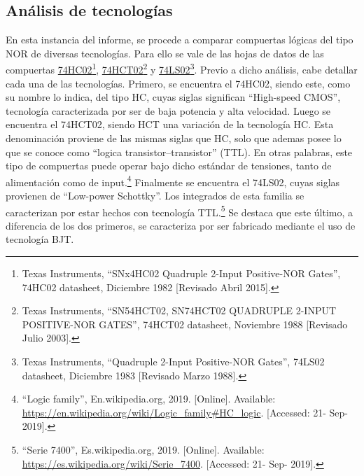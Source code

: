 


\subsection{Análisis de tecnologías}

En esta instancia del informe, se procede a comparar compuertas lógicas del tipo NOR de diversas tecnologías. Para ello se vale de las hojas de datos de las compuertas \href{http://www.ti.com/product/SN74HC02}{74HC02}\footnote{Texas Instruments, ``SNx4HC02 Quadruple 2-Input Positive-NOR Gates'', 74HC02 datasheet, Diciembre 1982 [Revisado Abril 2015].}, \href{http://www.ti.com/product/SN74HCT02}{74HCT02}\footnote{Texas Instruments, ``SN54HCT02, SN74HCT02 QUADRUPLE 2-INPUT POSITIVE-NOR GATES'', 74HCT02 datasheet, Noviembre 1988 [Revisado Julio 2003].} y \href{http://www.ti.com/product/SN74LS02}{74LS02}\footnote{Texas Instruments, ``Quadruple 2-Input Positive-NOR Gates'', 74LS02 datasheet, Diciembre 1983 [Revisado Marzo 1988].}. Previo a dicho análisis, cabe detallar cada una de las tecnologías. Primero, se encuentra el 74HC02, siendo este, como su nombre lo indica, del tipo HC, cuyas siglas significan ``High-speed CMOS'', tecnología caracterizada por ser de baja potencia y alta velocidad. Luego se encuentra el 74HCT02, siendo HCT una variación de la tecnología HC. Esta denominación proviene de las mismas siglas que HC, solo que ademas posee lo que se conoce como ``logica transistor–transistor'' (TTL). En otras palabras, este tipo de compuertas puede operar bajo dicho estándar de tensiones, tanto de alimentación como de input.\footnote{``Logic family'', En.wikipedia.org, 2019. [Online]. Available: \url{https://en.wikipedia.org/wiki/Logic\_family\#HC\_logic}. [Accessed: 21- Sep- 2019].} Finalmente se encuentra el 74LS02, cuyas siglas provienen de ``Low-power Schottky''. Los integrados de esta familia se caracterizan por estar hechos con tecnología TTL.\footnote{``Serie 7400'', Es.wikipedia.org, 2019. [Online]. Available: \url{https://es.wikipedia.org/wiki/Serie\_7400}. [Accessed: 21- Sep- 2019].} Se destaca que este último, a diferencia de los dos primeros, se caracteriza por ser fabricado mediante el uso de tecnología BJT.

